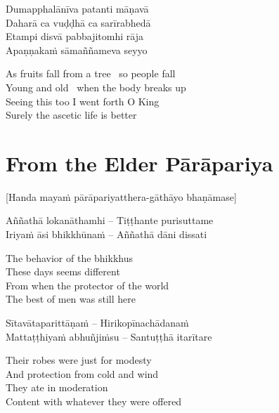 \begin{twochants}
  Dumapphalānīva patanti māṇavā\\
  Daharā ca vuḍḍhā ca sarīrabhedā\\
  Etampi disvā pabbajitomhi rāja\\
  Apaṇṇakaṁ sāmaññameva seyyo
\end{twochants}

\begin{english}
  As fruits fall from a tree \breathmark\ so people fall\\
  Young and old \breathmark\ when the body breaks up\\
  Seeing this too I went forth O King\\
  Surely the ascetic life is better
\end{english}

\suttaRef{[Thag 16.4 / MN 82]}


\section{From the Elder Pārāpariya}
\label{parapariya}

\begin{center}
  [Handa mayaṁ pārāpariyatthera-gāthāyo bhaṇāmase]
\end{center}

\begin{twochants}
  Aññathā lokanāthamhi – Tiṭṭhante purisuttame\\
  Iriyaṁ āsi bhikkhūnaṁ – Aññathā dāni dissati\\
\end{twochants}

\begin{english}
  The behavior of the bhikkhus\\
  These days seems different\\
  From when the protector of the world\\
  The best of men was still here
\end{english}

\begin{twochants}
  Sītavātaparittāṇaṁ – Hirikopīnachādanaṁ\\
  Mattaṭṭhiyaṁ abhuñjiṁsu – Santuṭṭhā itarītare\\
\end{twochants}

\begin{english}
  Their robes were just for modesty\\
  And protection from cold and wind\\
  They ate in moderation\\
  Content with whatever they were offered
\end{english}

